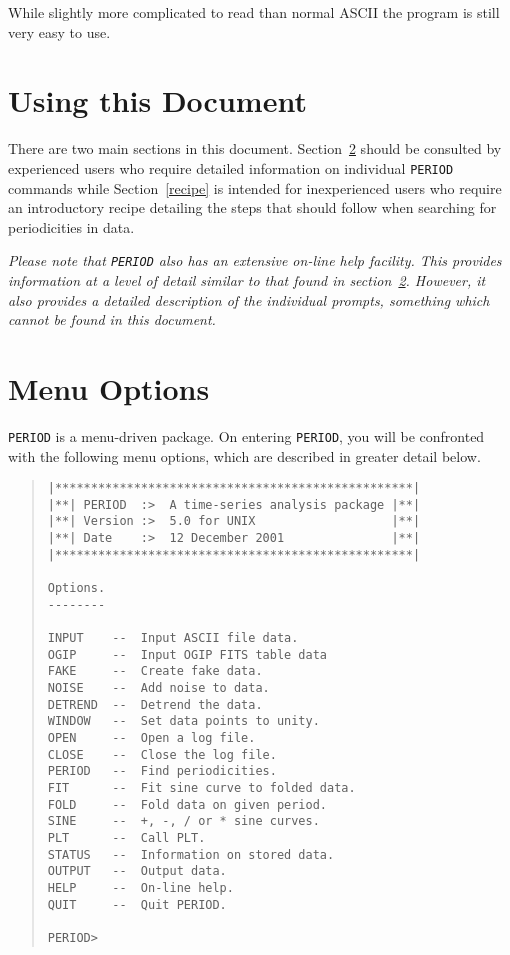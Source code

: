 While slightly more complicated to read than normal ASCII the
program is still very easy to use.

\section{Using this Document}

There are two main sections in this document.  Section~\ref{menu}
should be consulted by experienced users who require detailed
information on individual {\tt PERIOD} commands while
Section~\ref{recipe} is intended for inexperienced users who require an
introductory recipe detailing the steps that should follow when
searching for periodicities in data.

{\em Please note that {\tt PERIOD} also has an extensive on-line help
facility.  This provides information at a level of detail similar to
that found in section~\ref{menu}. However, it also provides a detailed
description of the individual prompts, something which cannot be found
in this document.}

\section{Menu Options}
\label{menu}

{\tt PERIOD} is a menu-driven package. On entering {\tt PERIOD}, you will be
confronted with the following menu options, which are described in greater
detail below.

\begin{quote}
\begin{verbatim}
|**************************************************|
|**| PERIOD  :>  A time-series analysis package |**|
|**| Version :>  5.0 for UNIX                   |**|
|**| Date    :>  12 December 2001               |**|
|**************************************************|

Options.
--------

INPUT    --  Input ASCII file data.
OGIP     --  Input OGIP FITS table data
FAKE     --  Create fake data.
NOISE    --  Add noise to data.
DETREND  --  Detrend the data.
WINDOW   --  Set data points to unity.
OPEN     --  Open a log file.
CLOSE    --  Close the log file.
PERIOD   --  Find periodicities.
FIT      --  Fit sine curve to folded data.
FOLD     --  Fold data on given period.
SINE     --  +, -, / or * sine curves.
PLT      --  Call PLT.
STATUS   --  Information on stored data.
OUTPUT   --  Output data.
HELP     --  On-line help.
QUIT     --  Quit PERIOD.

PERIOD>
\end{verbatim}
\end{quote}

